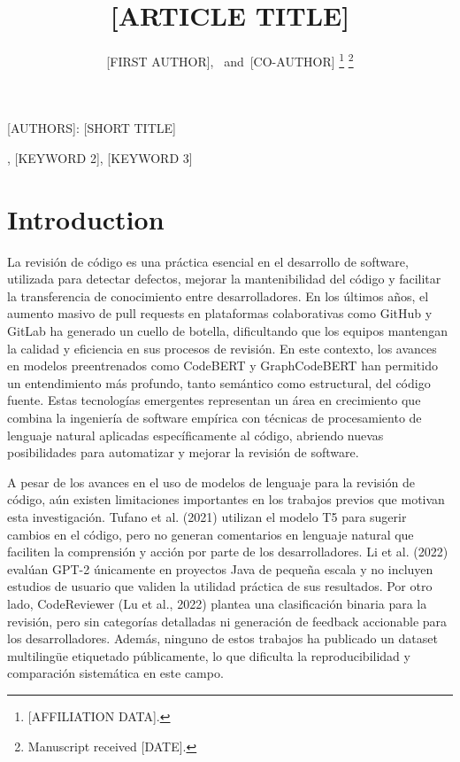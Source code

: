 \documentclass[journal]{IEEEtran}
\begin{document}
\title{[ARTICLE TITLE]}

\author{[FIRST AUTHOR],~
        and~[CO-AUTHOR]%
\thanks{[AFFILIATION DATA].}%
\thanks{Manuscript received [DATE].}}

%
{[AUTHORS]: [SHORT TITLE]}

\maketitle

\begin{abstract}
\end{abstract}

\begin{IEEEkeywords}
[KEYWORD 1], [KEYWORD 2], [KEYWORD 3]
\end{IEEEkeywords}

\IEEEpeerreviewmaketitle


\section{Introduction}
\label{sec:intro}

La revisión de código es una práctica esencial en el desarrollo de software, utilizada para detectar defectos, mejorar la mantenibilidad del código y facilitar la transferencia de conocimiento entre desarrolladores. En los últimos años, el aumento masivo de pull requests en plataformas colaborativas como GitHub y GitLab ha generado un cuello de botella, dificultando que los equipos mantengan la calidad y eficiencia en sus procesos de revisión. En este contexto, los avances en modelos preentrenados como CodeBERT y GraphCodeBERT han permitido un entendimiento más profundo, tanto semántico como estructural, del código fuente. Estas tecnologías emergentes representan un área en crecimiento que combina la ingeniería de software empírica con técnicas de procesamiento de lenguaje natural aplicadas específicamente al código, abriendo nuevas posibilidades para automatizar y mejorar la revisión de software.

A pesar de los avances en el uso de modelos de lenguaje para la revisión de código, aún existen limitaciones importantes en los trabajos previos que motivan esta investigación. Tufano et al. (2021) utilizan el modelo T5 para sugerir cambios en el código, pero no generan comentarios en lenguaje natural que faciliten la comprensión y acción por parte de los desarrolladores. Li et al. (2022) evalúan GPT-2 únicamente en proyectos Java de pequeña escala y no incluyen estudios de usuario que validen la utilidad práctica de sus resultados. Por otro lado, CodeReviewer (Lu et al., 2022) plantea una clasificación binaria para la revisión, pero sin categorías detalladas ni generación de feedback accionable para los desarrolladores. Además, ninguno de estos trabajos ha publicado un dataset multilingüe etiquetado públicamente, lo que dificulta la reproducibilidad y comparación sistemática en este campo.
\end{document}
